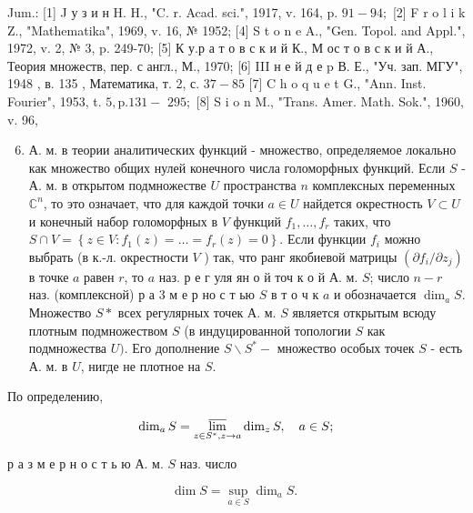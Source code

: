\documentclass[10pt]{article}
\begin{document}
Jum.: [1] J у з и н H. H., "C. r. Acad. sci.", 1917, v. 164, p. $91-94 ;$ [2] F r o l i k Z., "Mathematika", 1969, v. 16, № 1952; [4] S t o n e A., "Gen. Topol. and Appl.", 1972, v. 2, № 3, p. 249-70; [5] К у.р а т о в с к и й К., М ос т о в с к и й А., Теория множеств, пер. с англ., М., 1970; [6] III н е й д е p В. Е., "Уч. зап. МГУ", 1948 , в. 135 , Математика, т. 2, с. $37-85$ [7] C h o q u e t G., "Ann. Inst. Fourier", 1953, t. $5, \mathrm{p} .131-$ $295 ;$ [8] S i o n M., "Trans. Amer. Math. Sok.", 1960, v. 96,



\begin{enumerate}

  \setcounter{enumi}{5}

  \item А. м. в теории аналитических функций - множество, определяемое локально как множество общих нулей конечного числа голоморфных функций. Если $S$ - А. м. в открытом подмножестве $U$ пространства $n$ комплексных переменных $\mathbb{C}^{n}$, то это означает, что для каждой точки $a \in U$ найдется окрестность $V \subset U$ и конечный набор голоморфных в $V$ функций $f_{1}, \ldots, f_{r}$ таких, что $S \cap V=\left\{z \in V: f_{1}(z)=\ldots=f_{r}(z)=0\right\}$. Если функции $f_{i}$ можно выбрать (в к.-л. окрестности $V$ ) так, что ранг якобиевой матрицы $\left(\partial f_{i} / \partial z_{j}\right)$ в точке $a$ равен $r$, то $a$ наз. р е г уля ян о й точ к о й А. м. $S$; число $n-r$ наз. (комплексной) р а 3 м е р но с т ью $S$ в т о ч к $a$ и обозначается $\operatorname{dim}_{a} S$. Множество $S *$ всех регулярных точек А. м. $S$ является открытым всюду плотным подмножеством $S$ (в индуцированной топологии $S$ как подмножества $U)$. Его дополнение $S \backslash S^{*}-$ множество особых точек $S$ - есть А. м. в $U$, нигде не плотное на $S$.

\end{enumerate}



По определению,



\[

\operatorname{dim}_{a} S=\varlimsup_{z \in S^{*}, z \rightarrow a} \operatorname{dim}_{z} S, \quad a \in S ;

\]



р а з м е р н о с т ь ю А. м. $S$ наз. число



\[

\operatorname{dim} S=\sup _{a \in S} \operatorname{dim}_{a} S \text {. }

\]
\end{document}
